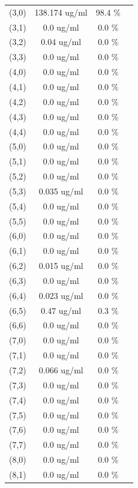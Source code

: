 \documentclass{article}
\begin{document}
\begin{tabular}{c c c c}
(3,0)&        138.174 ug/ml        &98.4 \%\\
(3,1)&        0.0 ug/ml        &0.0 \%\\
(3,2)&        0.04 ug/ml        &0.0 \%\\
(3,3)&        0.0 ug/ml        &0.0 \%\\
(4,0)&        0.0 ug/ml        &0.0 \%\\
(4,1)&        0.0 ug/ml        &0.0 \%\\
(4,2)&        0.0 ug/ml        &0.0 \%\\
(4,3)&        0.0 ug/ml        &0.0 \%\\
(4,4)&        0.0 ug/ml        &0.0 \%\\
(5,0)&        0.0 ug/ml        &0.0 \%\\
(5,1)&        0.0 ug/ml        &0.0 \%\\
(5,2)&        0.0 ug/ml        &0.0 \%\\
(5,3)&        0.035 ug/ml        &0.0 \%\\
(5,4)&        0.0 ug/ml        &0.0 \%\\
(5,5)&        0.0 ug/ml        &0.0 \%\\
(6,0)&        0.0 ug/ml        &0.0 \%\\
(6,1)&        0.0 ug/ml        &0.0 \%\\
(6,2)&        0.015 ug/ml        &0.0 \%\\
(6,3)&        0.0 ug/ml        &0.0 \%\\
(6,4)&        0.023 ug/ml        &0.0 \%\\
(6,5)&        0.47 ug/ml        &0.3 \%\\
(6,6)&        0.0 ug/ml        &0.0 \%\\
(7,0)&        0.0 ug/ml        &0.0 \%\\
(7,1)&        0.0 ug/ml        &0.0 \%\\
(7,2)&        0.066 ug/ml        &0.0 \%\\
(7,3)&        0.0 ug/ml        &0.0 \%\\
(7,4)&        0.0 ug/ml        &0.0 \%\\
(7,5)&        0.0 ug/ml        &0.0 \%\\
(7,6)&        0.0 ug/ml        &0.0 \%\\
(7,7)&        0.0 ug/ml        &0.0 \%\\
(8,0)&        0.0 ug/ml        &0.0 \%\\
(8,1)&        0.0 ug/ml        &0.0 \%\\

\end{tabular}
\end{document}
